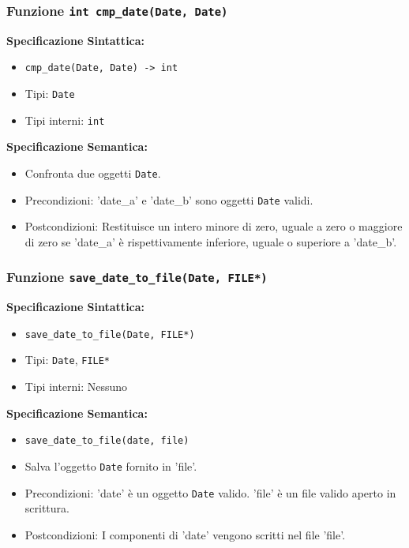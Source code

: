 \documentclass[11pt]{scrartcl} %
\begin{document}
\subsubsection{Funzione \texttt{int cmp\_date(Date, Date) }}

\textbf{Specificazione Sintattica:}
\begin{itemize}
	\item \texttt{cmp\_date(Date, Date) -> int}
	\item Tipi: \texttt{Date}
	\item Tipi interni: \texttt{int}
\end{itemize}

\textbf{Specificazione Semantica:}
\begin{itemize}
	\item Confronta due oggetti \texttt{Date}.
	\item Precondizioni: 'date\_a' e 'date\_b' sono oggetti \texttt{Date} validi.
	\item Postcondizioni: Restituisce un intero minore di zero, uguale a zero o maggiore di zero se 'date\_a' è rispettivamente inferiore, uguale o superiore a 'date\_b'.
\end{itemize}

\subsubsection{Funzione \texttt{save\_date\_to\_file(Date, FILE*)}}

\textbf{Specificazione Sintattica:}
\begin{itemize}
	\item \texttt{save\_date\_to\_file(Date, FILE*)}
	\item Tipi: \texttt{Date}, \texttt{FILE*}
	\item Tipi interni: Nessuno
\end{itemize}

\textbf{Specificazione Semantica:}
\begin{itemize}
	\item \texttt{save\_date\_to\_file(date, file)}
	\item Salva l'oggetto \texttt{Date} fornito in 'file'.
	\item Precondizioni: 'date' è un oggetto \texttt{Date} valido. 'file' è un file valido aperto in scrittura.
	\item Postcondizioni: I componenti di 'date' vengono scritti nel file 'file'.
\end{itemize}
\end{document}
